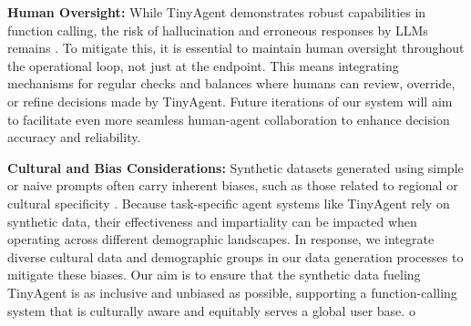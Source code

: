 \textbf{Human Oversight:} While TinyAgent demonstrates robust capabilities in function calling, the risk of hallucination and erroneous responses by LLMs remains \cite{zhang2023siren}. To mitigate this, it is essential to maintain human oversight throughout the operational loop, not just at the endpoint. This means integrating mechanisms for regular checks and balances where humans can review, override, or refine decisions made by TinyAgent. Future iterations of our system will aim to facilitate even more seamless human-agent collaboration to enhance decision accuracy and reliability.

\textbf{Cultural and Bias Considerations:} 
Synthetic datasets generated using simple or naive prompts often carry inherent biases, such as those related to regional or cultural specificity \cite{yu2024large}. Because task-specific agent systems like TinyAgent rely on synthetic data, their effectiveness and impartiality can be impacted when operating across different demographic landscapes. In response, we integrate diverse cultural data and demographic groups in our data generation processes to mitigate these biases. Our aim is to ensure that the synthetic data fueling TinyAgent is as inclusive and unbiased as possible, supporting a function-calling system that is culturally aware and equitably serves a global user base.
o

